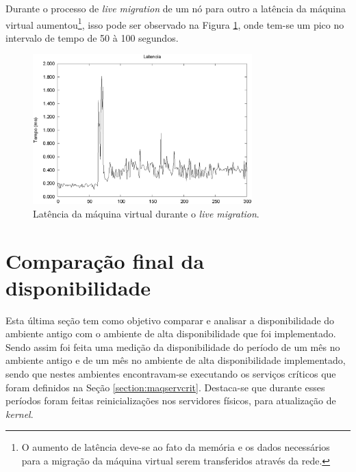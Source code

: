 Durante o processo de \textit{live migration} de um nó para outro a latência da máquina virtual aumentou\footnote[1]{
O aumento de latência deve-se ao fato da memória e os dados necessários para a migração da máquina virtual serem transferidos através da rede.}, 
isso pode ser observado na Figura \ref{fig:teste2_latencia}, onde tem-se um pico no intervalo de tempo de 50 à 100 segundos.
\begin{figure}[h!]
 \centering
 \includegraphics[width=320px]{img/teste2_latencia.eps}
 \caption{Latência da máquina virtual durante o \textit{live migration}.}
 \label{fig:teste2_latencia}
\end{figure}



\section{Comparação final da disponibilidade}
\label{section:comparacaofinal}

Esta última seção tem como objetivo comparar e analisar a disponibilidade do ambiente antigo com o ambiente de alta disponibilidade que foi 
implementado. Sendo assim foi feita uma medição da disponibilidade do período de um mês no ambiente antigo e de um mês no ambiente de alta 
disponibilidade implementado, sendo que nestes ambientes encontravam-se executando os serviços críticos que foram definidos na 
Seção \ref{section:maqservcrit}. Destaca-se que durante esses períodos foram feitas reinicializações nos servidores físicos, para atualização de
\textit{kernel}.


